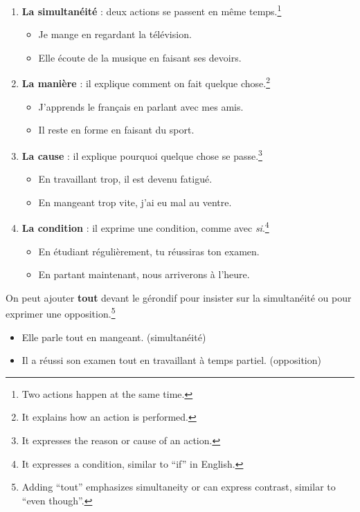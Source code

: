 \documentclass[math,code]{amznotes}
\theoremstyle{remark}
\begin{document}
\begin{enumerate}
    \item \textbf{La simultanéité} : deux actions se passent en même temps.\footnote{Two actions happen at the same time.}
    \begin{itemize}
        \item Je mange en regardant la télévision.
        \item Elle écoute de la musique en faisant ses devoirs.
    \end{itemize}

    \item \textbf{La manière} : il explique comment on fait quelque chose.\footnote{It explains how an action is performed.}
    \begin{itemize}
        \item J'apprends le français en parlant avec mes amis.
        \item Il reste en forme en faisant du sport.
    \end{itemize}

    \item \textbf{La cause} : il explique pourquoi quelque chose se passe.\footnote{It expresses the reason or cause of an action.}
    \begin{itemize}
        \item En travaillant trop, il est devenu fatigué.
        \item En mangeant trop vite, j'ai eu mal au ventre.
    \end{itemize}

    \item \textbf{La condition} : il exprime une condition, comme avec \textit{si}.\footnote{It expresses a condition, similar to ``if'' in English.}
    \begin{itemize}
        \item En étudiant régulièrement, tu réussiras ton examen.
        \item En partant maintenant, nous arriverons à l'heure.
    \end{itemize}
\end{enumerate}

\begin{notebox}
    On peut ajouter \textbf{tout} devant le gérondif pour insister sur la simultanéité ou pour exprimer une opposition.\footnote{Adding ``tout'' emphasizes simultaneity or can express contrast, similar to ``even though''.}
    \begin{itemize}
        \item Elle parle tout en mangeant. (simultanéité)
        \item Il a réussi son examen tout en travaillant à temps partiel. (opposition)
    \end{itemize}
\end{notebox}
\end{document}
